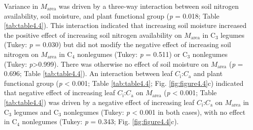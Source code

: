 Variance in $M_\mathrm{area}$ was driven by a three-way interaction between soil nitrogen availability, soil moisture, and plant functional group (\textit{p} = 0.018; Table \ref{tab:table4.4}). This interaction indicated that increasing soil moisture increased the positive effect of increasing soil nitrogen availability on $M_\mathrm{area}$ in C$_3$ legumes (Tukey: \textit{p} = 0.030) but did not modify the negative effect of increasing soil nitrogen on $M_\mathrm{area}$ in C$_4$ nonlegumes (Tukey: \textit{p} = 0.511) or C$_3$ nonlegumes (Tukey: \textit{p}>0.999). There was otherwise no effect of soil moisture on $M_\mathrm{area}$ (\textit{p} = 0.696; Table \ref{tab:table4.4}). An interaction between leaf $C_\mathrm{i}$:$C_\mathrm{a}$ and plant functional group (\textit{p} < 0.001; Table \ref{tab:table4.4}; Fig. \ref{fig:figure4.4}c) indicated that negative effect of increasing leaf $C_\mathrm{i}$:$C_\mathrm{a}$ on $M_\mathrm{area}$ (\textit{p} < 0.001; Table \ref{tab:table4.4}) was driven by a negative effect of increasing leaf $C_\mathrm{i}$:$C_\mathrm{a}$ on $M_\mathrm{area}$ in C$_3$ legumes and C$_3$ nonlegumes (Tukey: \textit{p} < 0.001 in both cases), with no effect in C$_4$ nonlegumes (Tukey: \textit{p} = 0.343; Fig. \ref{fig:figure4.4}c).

